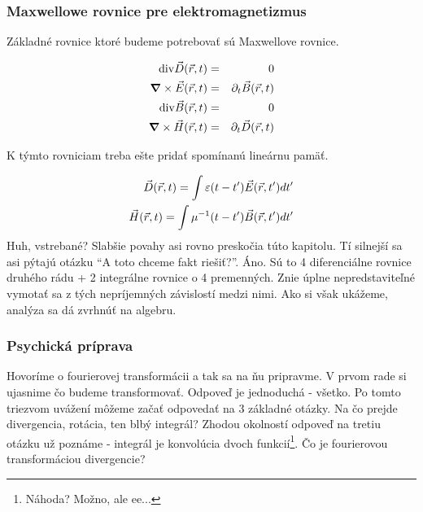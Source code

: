 \subsubsection{Maxwellowe rovnice pre elektromagnetizmus}


Základné rovnice ktoré budeme potrebovať sú Maxwellove
rovnice.

\def\rt{{(\vektor{r},t)}}
\def\kw{{(\vektor{k},\omega)}}

\begin{eqnarray}
  \div{\vektor{D}\rt} & = & 0 \\
  \curl{\vektor{E}\rt} & = & \partial_t \vektor{B} \rt \\
  \div{\vektor{B}\rt} & = & 0 \\
  \curl{\vektor{H}\rt} & = & \partial_t \vektor{D} \rt
\end{eqnarray}

K týmto rovniciam treba ešte pridať spomínanú lineárnu pamäť.

\begin{eqnarray}
  \vektor{D}\rt = \int \eps(t-t') \vektor{E}(\vektor{r},t') dt' \\
  \vektor{H}\rt = \int \mu^{-1}(t-t') \vektor{B}(\vektor{r},t') dt'
\end{eqnarray}
Huh, vstrebané? Slabšie povahy asi rovno preskočia túto kapitolu. Tí
silnejší sa asi pýtajú otázku ``A toto chceme fakt riešiť?''. Áno.
Sú to 4 diferenciálne rovnice druhého rádu + 2 integrálne rovnice o 4
premenných. Znie úplne nepredstaviteľné vymotať sa z tých nepríjemných
závislostí medzi nimi. Ako si však ukážeme, analýza sa dá zvrhnúť na
algebru.

\subsubsection{Psychická príprava}
Hovoríme o fourierovej transformácii a tak sa na ňu pripravme. V prvom
rade si ujasnime čo budeme transformovať. Odpoveď je jednoduchá -
všetko. Po tomto triezvom uvážení môžeme začať odpovedať na 3 základné
otázky. Na čo prejde divergencia, rotácia, ten blbý integrál? Zhodou
okolností odpoveď na tretiu otázku už poznáme - integrál je konvolúcia
dvoch funkcií\footnote{Náhoda? Možno, ale ee...}. Čo je fourierovou
transformáciou divergencie?


